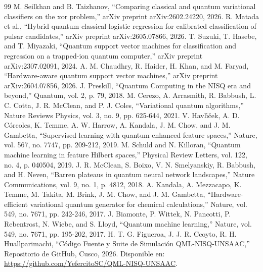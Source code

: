 \documentclass[12pt,oneside]{report}
\begin{document}
\newpage
\begin{thebibliography}{99}
 M. Seilkhan and B. Taizhanov, ``Comparing classical and quantum variational classifiers on the xor problem,'' arXiv preprint arXiv:2602.24220, 2026.
 R. Matada et al., ``Hybrid quantum-classical logistic regression for calibrated classification of pulsar candidates,'' arXiv preprint arXiv:2605.07866, 2026.
 T. Suzuki, T. Hasebe, and T. Miyazaki, ``Quantum support vector machines for classification and regression on a trapped-ion quantum computer,'' arXiv preprint arXiv:2307.02091, 2024.
 A. M. Chaudhry, R. Haider, H. Khan, and M. Faryad, ``Hardware-aware quantum support vector machines,'' arXiv preprint arXiv:2604.07856, 2026.
 J. Preskill, ``Quantum Computing in the NISQ era and beyond,'' Quantum, vol. 2, p. 79, 2018.
 M. Cerezo, A. Arrasmith, R. Babbush, L. C. Cotta, J. R. McClean, and P. J. Coles, ``Variational quantum algorithms,'' Nature Reviews Physics, vol. 3, no. 9, pp. 625-644, 2021.
 V. Havl{\'\i}{\v{c}}ek, A. D. C{\'o}rcoles, K. Temme, A. W. Harrow, A. Kandala, J. M. Chow, and J. M. Gambetta, ``Supervised learning with quantum-enhanced feature spaces,'' Nature, vol. 567, no. 7747, pp. 209-212, 2019.
 M. Schuld and N. Killoran, ``Quantum machine learning in feature Hilbert spaces,'' Physical Review Letters, vol. 122, no. 4, p. 040504, 2019.
 J. R. McClean, S. Boixo, V. N. Smelyanskiy, R. Babbush, and H. Neven, ``Barren plateaus in quantum neural network landscapes,'' Nature Communications, vol. 9, no. 1, p. 4812, 2018.
 A. Kandala, A. Mezzacapo, K. Temme, M. Takita, M. Brink, J. M. Chow, and J. M. Gambetta, ``Hardware-efficient variational quantum generator for chemical calculations,'' Nature, vol. 549, no. 7671, pp. 242-246, 2017.
 J. Biamonte, P. Wittek, N. Pancotti, P. Rebentrost, N. Wiebe, and S. Lloyd, ``Quantum machine learning,'' Nature, vol. 549, no. 7671, pp. 195-202, 2017.
 H. T. G. Figueroa, J. J. R. Ccoyto, R. H. Huallparimachi, ``Código Fuente y Suite de Simulación QML-NISQ-UNSAAC,'' Repositorio de GitHub, Cusco, 2026. Disponible en: \url{https://github.com/YefercitoSC/QML-NISQ-UNSAAC}.
\end{thebibliography}
\end{document}

